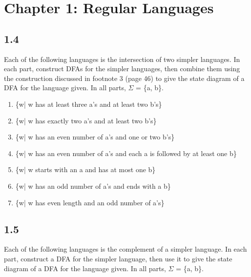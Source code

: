 \section{Chapter 1: Regular Languages}

\subsection*{1.4}

Each of the following languages is the intersection of two simpler languages. In each part, construct DFAs for the simpler languages, then combine them using the construction discussed in footnote 3 (page 46) to give the state diagram of a DFA for the language given. In all parts, $\Sigma$ = \{a, b\}.

\begin{enumerate}[label=(\alph*), leftmargin=2.5em]

\item \{w| w has at least three a's and at least two b's\}

\item \{w| w has exactly two a's and at least two b's\}

\item \{w| w has an even number of a's and one or two b's\}

\item \{w| w has an even number of a's and each a is followed by at least one b\}

\item \{w| w starts with an a and has at most one b\}

\item \{w| w has an odd number of a's and ends with a b\}

\item \{w| w has even length and an odd number of a's\}

\end{enumerate}


\subsection*{1.5}

Each of the following languages is the complement of a simpler language. In each part, construct a DFA for the simpler language, then use it to give the state diagram of a DFA for the language given. In all parts, $\Sigma$ = \{a, b\}.

